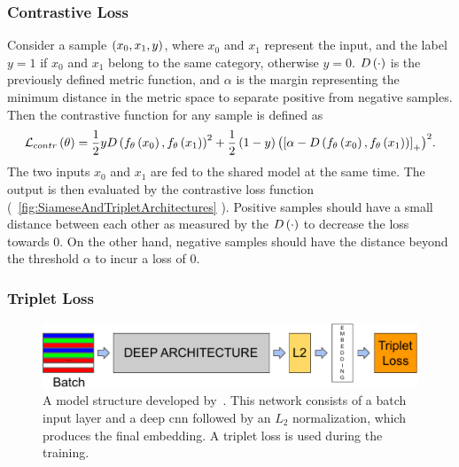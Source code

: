 \subsubsection{Contrastive Loss}

Consider a sample $\left( {x_0, x_1, y} \right)$, where $x_0$ and $x_1$ represent the input, and the label $y = 1$ if $x_0$ and $x_1$ belong to the same category, otherwise $y = 0$. ${D} \left( \cdot \right)$ is the previously defined metric function, and $\alpha$ is the margin representing the minimum distance in the metric space to separate positive from negative samples. Then the contrastive function for any sample is defined as~\cite{hadsell2006dimreduction}
\begin{equation}
    \label{eq:ContrastiveLoss}
    {\mathcal{L}_{contr}} \left( \theta \right) =
    \frac{1}{2}y
    {{D} \left( {f_\theta} \left( x_0 \right), {f_\theta} \left( x_1 \right) \right)}^2 +
    \frac{1}{2}
    \left( {1 - y} \right) {\left( {
            \left[ {\alpha - {D} \left( {f_\theta} \left( x_0 \right), {f_\theta} \left( x_1 \right) \right)} \right]_{+}} \right)}^2.
\end{equation}
The two inputs $x_0$ and $x_1$ are fed to the shared model at the same time. The output is then evaluated by the contrastive loss function (\figstr{}~\ref{fig:SiameseAndTripletArchitectures} ). Positive samples should have a small distance between each other as measured by the ${D} \left( \cdot \right)$ to decrease the loss towards $0$. On the other hand, negative samples should have the distance beyond the threshold $\alpha$ to incur a loss of $0$.

\subsubsection{Triplet Loss}

\begin{figure}[t]
    \centerline{\includegraphics[width=0.8\linewidth]{figures/theoretical_foundations/triplet_loss_model_structure.pdf}}
    \caption[Triplet loss architecture]{A model structure developed by~\cite{schroff2015facenet}. This network consists of a batch input layer and a deep \gls{cnn} followed by an $L_2$ normalization, which produces the final embedding. A triplet loss is used during the training. }
    \label{fig:TripletLossModelStructure}
\end{figure}

